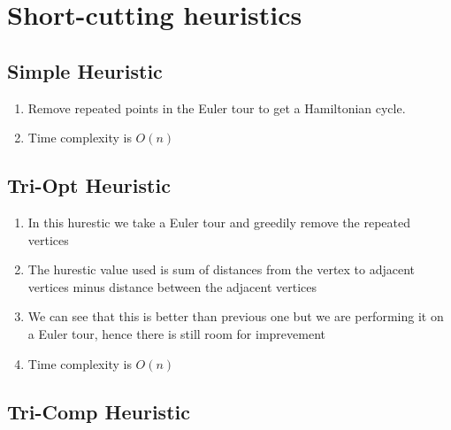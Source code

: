 \chapter{Short-cutting heuristics}


\section{Simple Heuristic}
\begin{enumerate}
    \item Remove repeated points in the Euler tour to get a Hamiltonian cycle.
    \item Time complexity is $O(n)$
\end{enumerate}

\section{Tri-Opt Heuristic}

\begin{enumerate}
    \item In this hurestic we take a Euler tour and greedily remove the repeated vertices
    \item The hurestic value used is sum of distances from the vertex to adjacent vertices minus distance between the adjacent vertices
    \item We can see that this is better than previous one but we are performing it on a Euler tour, hence there is still room for imprevement
    \item Time complexity is $O(n)$
\end{enumerate}



\section{Tri-Comp Heuristic}

